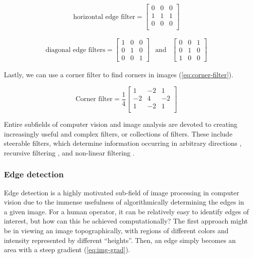 \begin{equation}
    \text{horizontal edge filter} =\begin{bmatrix}
        0 & 0 & 0 \\
        1 & 1 & 1 \\
        0 & 0 & 0 \\
    \end{bmatrix}
    \label{eq:horiz-edge-filter}
\end{equation}

\begin{equation}
    \begin{aligned}
        \text{diagonal edge filters} = \begin{bmatrix}
            1 & 0 & 0 \\
            0 & 1 & 0\\
            0 & 0 & 1
        \end{bmatrix}& \text{and} & 
        \begin{bmatrix}
            0 & 0 & 1 \\
            0 & 1 & 0\\
            1 & 0 & 0
        \end{bmatrix}
    \end{aligned}
    \label{eq:diag-edge-filter}
\end{equation}

Lastly, we can use a corner filter to find corners in images (\cref{eq:corner-filter}).

\begin{equation}
    \text{Corner filter} = \frac{1}{4}\begin{bmatrix}
        1 & -2 & 1 \\
        -2 & 4 & -2 \\
        1 & -2 & 1 \\
    \end{bmatrix}
    \label{eq:corner-filter}
\end{equation}

Entire subfields of computer vision and image analysis are devoted to creating increasingly useful and complex filters, or collections of filters. These include steerable filters, which determine information occurring in arbitrary directions \cite{freemanSteerableFiltersLocal1992}, recursive filtering \cite{nielsenRegularizationScalespaceEdge1996}, and non-linear filtering \cite{tomasiBilateralFilteringGray1998}.

\subsubsection{Edge detection}
Edge detection is a highly motivated sub-field of image processing in computer vision due to the immense usefulness of algorithmically determining the edges in a given image.
For a human operator, it can be relatively easy to identify edges of interest, but how can this be achieved computationally?
The first approach might be in viewing an image topographically, with regions of different colors and intensity represented by different ``heights''.
Then, an edge simply becomes an area with a steep gradient (\cref{eq:img-grad}).

